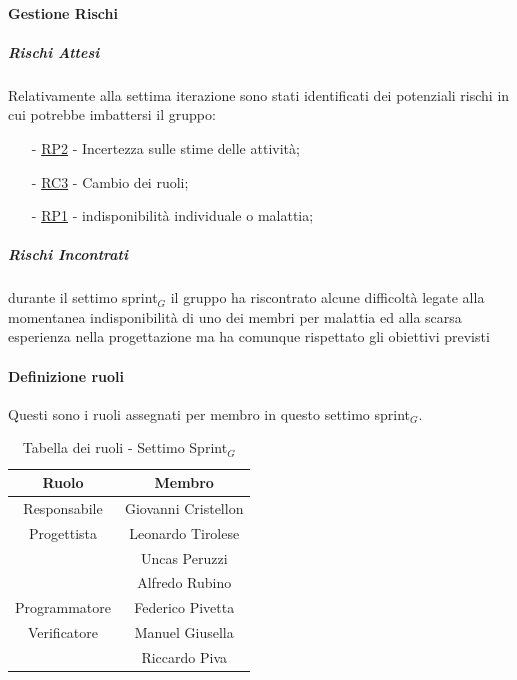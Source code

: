 \documentclass[10pt]{article}
\begin{document}
{{{{{{{{        \paragraph{Gestione Rischi}\mbox{}
        \vspace{-1em}
        \subparagraph*{Rischi Attesi}\mbox{}
        
        Relativamente alla settima iterazione sono stati identificati dei potenziali rischi in cui potrebbe imbattersi il gruppo:
        \vspace{-0.5em}
        \begin{itemize}
        \setlength\itemsep{-0.2em}
        \item [-] \hyperref[RP2]{RP2} - Incertezza sulle stime delle attività;
        \item [-] \hyperref[RC3]{RC3} - Cambio dei ruoli;
        \item [-] \hyperref[RP1]{RP1} - indisponibilità individuale o malattia;
        \end{itemize}

        \subparagraph*{Rischi Incontrati}\mbox{}
        durante il settimo sprint$_G$ il gruppo ha riscontrato alcune difficoltà legate alla momentanea indisponibilità di uno dei membri per malattia ed alla scarsa esperienza nella progettazione ma ha comunque rispettato gli obiettivi previsti
        

        \paragraph{Definizione ruoli}\mbox{}\vspace{0.4em}
        
        Questi sono i ruoli assegnati per membro in questo settimo sprint$_G$.\\
        \begin{table}[H]
            \centering
            \begin{tabular}{|c|c|}
            \hline
            \rowcolor{gray!25}
            \textbf{Ruolo} & \textbf{Membro}\\
            \hline
            Responsabile & Giovanni Cristellon \\
            \hline
            Progettista & Leonardo Tirolese \\
            & Uncas Peruzzi\\
            & Alfredo Rubino\\
            \hline
            Programmatore & Federico Pivetta\\
            \hline
            Verificatore & Manuel Giusella \\
            & Riccardo Piva\\
            \hline
            \end{tabular}
            \caption{Tabella dei ruoli - Settimo Sprint$_G$}
        \end{table}

}}}}}}}}
\end{document}
